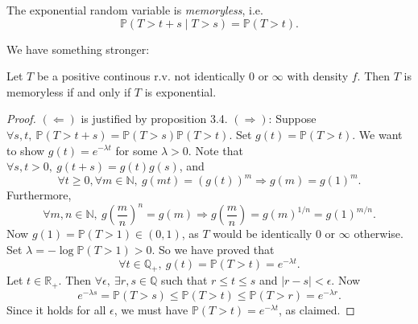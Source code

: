 \begin{proposition}
    The exponential random variable is \emph{memoryless}, i.e.
    \[
        \mathbb{P}(T > t+s \mid T>s) = \mathbb{P}(T>t).
    \]
\end{proposition}
We have something stronger:
\begin{proposition}
    Let $ T $ be a positive continous r.v. not identically $0$ or $ \infty $ with density $f$. Then $T$ is memoryless if and only if $T$ is exponential.
\end{proposition}
\begin{proof}
    $ (\Leftarrow) $ is justified by proposition 3.4. $ (\Rightarrow ) $: Suppose $ \forall s,t,\ \mathbb{P}(T>t+s)=\mathbb{P}(T>s)\mathbb{P}(T>t) $. Set $ g(t)=\mathbb{P}(T>t) $. We want to show $ g(t)=e^{-\lambda t} $ for some $ \lambda>0 $. Note that $ \forall s,t>0,\ g(t+s)=g(t)g(s) $, and 
    \[
        \forall t\ge 0, \forall m\in \mathbb{N},\ g(mt)=(g(t))^m \Longrightarrow g(m)=g(1)^m.
    \]
    Furthermore, 
    \[
        \forall m,n\in \mathbb{N},\ g\left( \frac{m}{n} \right)^n=g(m) \Longrightarrow g\left( \frac{m}{n} \right)= g(m)^{1/n}=g(1)^{m/n}.
    \]
    Now $ g(1)=\mathbb{P}(T>1)\in (0,1) $, as $T$ would be identically $0$ or $ \infty $ otherwise. Set $ \lambda=-\log \mathbb{P}(T>1)>0 $. So we have proved that 
    \[
        \forall t\in \mathbb{Q}_+,\ g(t)=\mathbb{P}(T>t)=e^{-\lambda t}.
    \]
    Let $ t\in \mathbb{R}_+ $. Then $ \forall \epsilon,\ \exists r,s\in \mathbb{Q} $ such that $ r\le t\le s $ and $ |r-s|<\epsilon $. Now
    \[
        e^{-\lambda s}=\mathbb{P}(T>s)\le \mathbb{P}(T>t)\le \mathbb{P}(T>r) = e^{-\lambda r}.
    \]
    Since it holds for all $ \epsilon $, we must have $ \mathbb{P}(T>t)=e^{-\lambda t} $, as claimed.
\end{proof}

